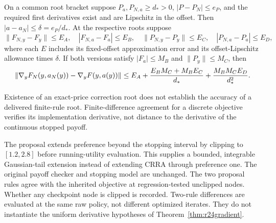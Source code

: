 \begin{theorem}\label{thm:r24gradient}
On a common root bracket suppose $P_a,P_{N,a}\geq d_*>0$, $|P-P_N|\leq e_P$, and the required first derivatives exist and are Lipschitz in the offset. Then $|a-a_N|\leq\delta=e_P/d_*$. At the respective roots suppose
\[
 \|F_{N,y}-F_y\|\leq E_A,\quad |F_{N,a}-F_a|\leq E_B,\quad
 \|P_{N,y}-P_y\|\leq E_C,\quad |P_{N,a}-P_a|\leq E_D,
\]
where each $E$ includes its fixed-offset approximation error and its offset-Lipschitz allowance times $\delta$. If both versions satisfy $|F_a|\leq M_B$ and $\|P_y\|\leq M_C$, then
\begin{equation}
 \|\nabla_yF_N(y,a_N(y))-\nabla_yF(y,a(y))\|
 \leq E_A+{E_BM_C+M_BE_C\over d_*}+{M_BM_CE_D\over d_*^2}.
 \label{eq:r24gradienterror}
\end{equation}
\end{theorem}
Existence of an exact-price correction root does not establish the accuracy of a delivered finite-rule root. Finite-difference agreement for a discrete objective verifies its implementation derivative, not distance to the derivative of the continuous stopped payoff.

The proposal extends preference beyond the stopping interval by clipping to $[1.2,2.8]$ before running-utility evaluation. This supplies a bounded, integrable Gaussian-tail extension instead of extending CRRA through preference one. The original payoff checker and stopping model are unchanged. The two proposal rules agree with the inherited objective at regression-tested unclipped nodes. Whether any checkpoint node is clipped is recorded. Two-rule differences are evaluated at the same raw policy, not different optimized iterates. They do not instantiate the uniform derivative hypotheses of Theorem~\ref{thm:r24gradient}.
